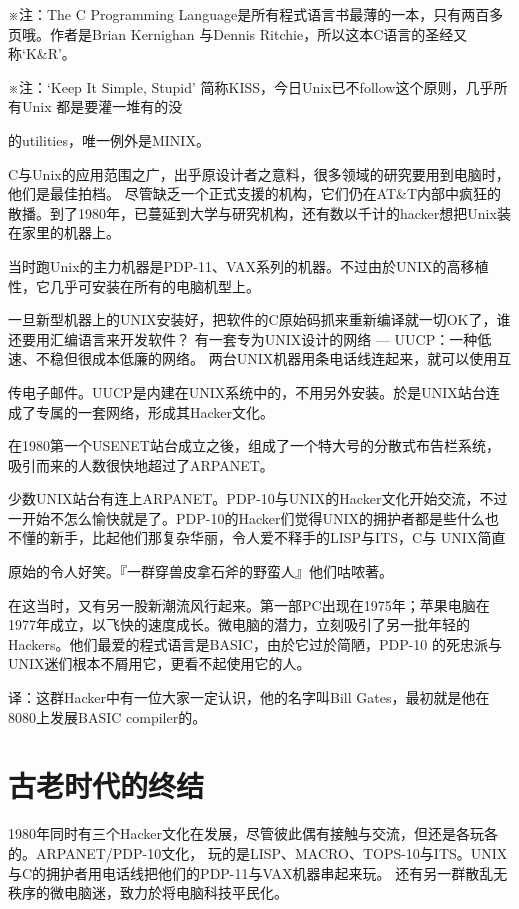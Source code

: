 \documentclass[a4paper,12pt,UTF8,twoside]{ctexbook}
\begin{document}
※注：The C Programming Language是所有程式语言书最薄的一本，只有两百多页哦。作者是Brian Kernighan 与Dennis Ritchie，所以这本C语言的圣经又称`K\&R'。

※注：`Keep It Simple, Stupid' 简称KISS，今日Unix已不follow这个原则，几乎所有Unix 都是要灌一堆有的没

的utilities，唯一例外是MINIX。

C与Unix的应用范围之广，出乎原设计者之意料，很多领域的研究要用到电脑时，他们是最佳拍档。 尽管缺乏一个正式支援的机构，它们仍在AT\&T内部中疯狂的散播。到了1980年，已蔓延到大学与研究机构，还有数以千计的hacker想把Unix装在家里的机器上。

当时跑Unix的主力机器是PDP-11、VAX系列的机器。不过由於UNIX的高移植性，它几乎可安装在所有的电脑机型上。

一旦新型机器上的UNIX安装好，把软件的C原始码抓来重新编译就一切OK了，谁还要用汇编语言来开发软件？ 有一套专为UNIX设计的网络 --- UUCP：一种低速、不稳但很成本低廉的网络。 两台UNIX机器用条电话线连起来，就可以使用互

传电子邮件。UUCP是内建在UNIX系统中的，不用另外安装。於是UNIX站台连成了专属的一套网络，形成其Hacker文化。

在1980第一个USENET站台成立之後，组成了一个特大号的分散式布告栏系统，吸引而来的人数很快地超过了ARPANET。

少数UNIX站台有连上ARPANET。PDP-10与UNIX的Hacker文化开始交流，不过一开始不怎么愉快就是了。PDP-10的Hacker们觉得UNIX的拥护者都是些什么也不懂的新手，比起他们那复杂华丽，令人爱不释手的LISP与ITS，C与 UNIX简直

原始的令人好笑。『一群穿兽皮拿石斧的野蛮人』他们咕哝著。

在这当时，又有另一股新潮流风行起来。第一部PC出现在1975年；苹果电脑在1977年成立，以飞快的速度成长。微电脑的潜力，立刻吸引了另一批年轻的Hackers。他们最爱的程式语言是BASIC，由於它过於简陋，PDP-10 的死忠派与UNIX迷们根本不屑用它，更看不起使用它的人。

译：这群Hacker中有一位大家一定认识，他的名字叫Bill Gates，最初就是他在8080上发展BASIC compiler的。

\chapter{古老时代的终结}

1980年同时有三个Hacker文化在发展，尽管彼此偶有接触与交流，但还是各玩各的。ARPANET/PDP-10文化， 玩的是LISP、MACRO、TOPS-10与ITS。UNIX与C的拥护者用电话线把他们的PDP-11与VAX机器串起来玩。 还有另一群散乱无秩序的微电脑迷，致力於将电脑科技平民化。
\end{document}
